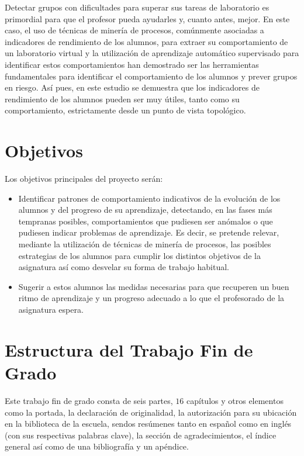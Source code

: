 Detectar grupos con dificultades para superar sus tareas de laboratorio es primordial para que el profesor pueda ayudarles y, cuanto antes, mejor. En este caso, el uso de técnicas de minería de procesos, comúnmente asociadas a indicadores de rendimiento de los alumnos, para extraer su comportamiento de un laboratorio virtual y la utilización de aprendizaje automático supervisado para identificar estos comportamientos han demostrado ser las herramientas fundamentales para identificar el comportamiento de los alumnos y prever grupos en riesgo. Así pues, en este estudio se demuestra que los indicadores de rendimiento de los alumnos pueden ser muy útiles, tanto como su comportamiento, estrictamente desde un punto de vista topológico.

\section{Objetivos}

Los objetivos principales del proyecto serán:
\begin{itemize}
\item Identificar patrones de comportamiento indicativos de la evolución de los alumnos y del progreso de su aprendizaje, detectando, en las fases más tempranas posibles, comportamientos que pudiesen ser anómalos o que pudiesen indicar problemas de aprendizaje. Es decir, se pretende relevar, mediante la utilización de técnicas de minería de procesos, las posibles estrategias de los alumnos para cumplir los distintos objetivos de la asignatura así como desvelar su forma de trabajo habitual.
\item Sugerir a estos alumnos las medidas necesarias para que recuperen un buen ritmo de aprendizaje y un progreso adecuado a lo que el profesorado de la asignatura espera.
\end{itemize}

\section{Estructura del Trabajo Fin de Grado}

Este trabajo fin de grado consta de seis partes, $16$ capítulos y otros elementos como la portada, la declaración de originalidad, la autorización para su ubicación en la biblioteca de la escuela, sendos resúmenes tanto en español como en inglés (con sus respectivas palabras clave), la sección de agradecimientos, el índice general así como de una bibliografía y un apéndice.


